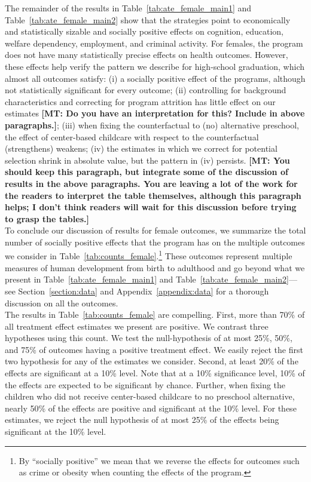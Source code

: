 \noindent The remainder of the results in Table~\ref{tab:ate_female_main1} and Table~\ref{tab:ate_female_main2} show that the strategies point to economically and statistically sizable and socially positive effects on cognition, education, welfare dependency, employment, and criminal activity. For females, the program does not have many statistically precise effects on health outcomes. However, these effects help verify the pattern we describe for high-school graduation, which almost all outcomes satisfy: (i) a socially positive effect of the programs, although not statistically significant for every outcome; (ii) controlling for background characteristics and correcting for program attrition has little effect on our estimates \textbf{[MT: Do you have an interpretation for this? Include in above paragraphs.]}; (iii) when fixing the counterfactual to (no) alternative preschool, the effect of center-based childcare with respect to the counterfactual (strengthens) weakens; (iv) the estimates in which we correct for potential selection shrink in absolute value, but the pattern in (iv) persists. \textbf{[MT: You should keep this paragraph, but integrate some of the discussion of results in the above paragraphs. You are leaving a lot of the work for the readers to interpret the table themselves, although this paragraph helps; I don't think readers will wait for this discussion before trying to grasp the tables.]}\\

\noindent To conclude our discussion of results for female outcomes, we summarize the total number of socially positive effects that the program has on the multiple outcomes we consider in Table~\ref{tab:counts_female}.\footnote{By ``socially positive'' we mean that we reverse the effects for outcomes such as crime or obesity when counting the effects of the program.} These outcomes represent multiple measures of human development from birth to adulthood and go beyond what we present in Table~\ref{tab:ate_female_main1} and Table~\ref{tab:ate_female_main2}---see Section~\ref{section:data} and Appendix~\ref{appendix:data} for a thorough discussion on all the outcomes.\\ 

\noindent The results in Table~\ref{tab:counts_female} are compelling. First, more than 70\% of all treatment effect estimates we present are positive. We contrast three hypotheses using this count. We test the null-hypothesis of at most 25\%, 50\%, and 75\% of outcomes having a positive treatment effect. We easily reject the first two hypothesis for any of the estimates we consider. Second, at least 20\% of the effects are significant at a 10\% level. Note that at a 10\% significance level, 10\% of the effects are expected to be significant by chance. Further, when fixing the children who did not receive center-based childcare to no preschool alternative, nearly 50\% of the effects are positive and significant at the 10\% level. For these estimates, we reject the null hypothesis of at most 25\% of the effects being significant at the 10\% level.

